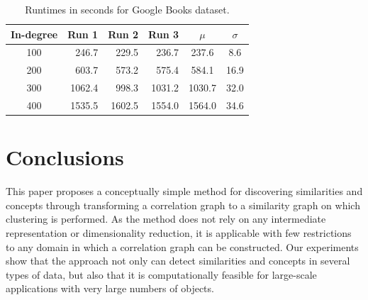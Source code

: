 \documentclass[conference]{IEEEtran}
\begin{document}
\begin{table}[!t]
\renewcommand{\arraystretch}{1.3}
\caption{Runtimes in seconds for Google Books dataset.}
\label{tab:google_runtimes}
\begin{center}
\begin{tabular}{c|r|r|r||c|c}
  \hline \bfseries In-degree  & \bfseries Run 1
  & \bfseries Run 2
  & \bfseries Run 3
  & \bfseries $\mu$
  & \bfseries $\sigma$
  \\
  \hline\hline 100
  & 246.7
  & 229.5
  & 236.7
  & 237.6
  & 8.6
  \\
  \hline 200
  & 603.7
  & 573.2
  & 575.4
  & 584.1
  & 16.9
  \\
  \hline 300
  & 1062.4
  & 998.3
  & 1031.2
  & 1030.7
  & 32.0
  \\
  \hline 400
  & 1535.5
  & 1602.5
  & 1554.0
  & 1564.0
  & 34.6
  \\
  \hline
\end{tabular}
\end{center}
\end{table}


\section{Conclusions}
\label{sec:conclusions}

This paper proposes a conceptually simple method for discovering similarities and concepts through transforming a
correlation graph to a similarity graph on which clustering is performed. As the method does not rely on any
intermediate representation or dimensionality reduction, it is applicable with few restrictions
to any domain in which a correlation graph can be constructed. Our experiments show that the approach not only can
detect similarities and concepts in several types of data, but also that it is computationally feasible for large-scale
applications with very large numbers of objects.
\end{document}

